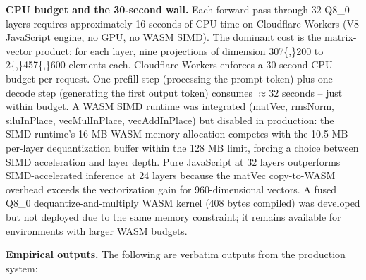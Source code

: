 \documentclass[
  11pt,
]{article}
\begin{document}
\textbf{CPU budget and the 30-second wall.} Each forward pass through 32
Q8\_0 layers requires approximately 16 seconds of CPU time on Cloudflare
Workers (V8 JavaScript engine, no GPU, no WASM SIMD). The dominant cost
is the matrix-vector product: for each layer, nine projections of
dimension 307\{,\}200 to 2\{,\}457\{,\}600 elements each. Cloudflare
Workers enforces a 30-second CPU budget per request. One prefill step
(processing the prompt token) plus one decode step (generating the first
output token) consumes \(\approx 32\) seconds -- just within budget. A
WASM SIMD runtime was integrated (matVec, rmsNorm, siluInPlace,
vecMulInPlace, vecAddInPlace) but disabled in production: the SIMD
runtime's 16 MB WASM memory allocation competes with the 10.5 MB
per-layer dequantization buffer within the 128 MB limit, forcing a
choice between SIMD acceleration and layer depth. Pure JavaScript at 32
layers outperforms SIMD-accelerated inference at 24 layers because the
matVec copy-to-WASM overhead exceeds the vectorization gain for
960-dimensional vectors. A fused Q8\_0 dequantize-and-multiply WASM
kernel (408 bytes compiled) was developed but not deployed due to the
same memory constraint; it remains available for environments with
larger WASM budgets.

\textbf{Empirical outputs.} The following are verbatim outputs from the
production system:
\end{document}
